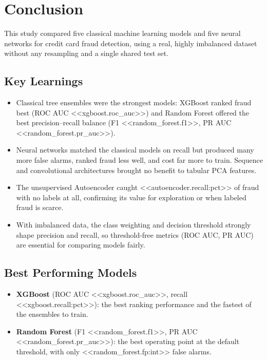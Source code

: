 \documentclass[journal]{IEEEtran}
\begin{document}
\section{Conclusion}
This study compared five classical machine learning models and five neural networks for credit card fraud detection, using a real, highly imbalanced dataset without any resampling and a single shared test set.

\subsection{Key Learnings}
\begin{itemize}
  \item Classical tree ensembles were the strongest models: XGBoost ranked fraud best (ROC AUC <<xgboost.roc_auc>>) and Random Forest offered the best precision--recall balance (F1 <<random_forest.f1>>, PR AUC <<random_forest.pr_auc>>).
  \item Neural networks matched the classical models on recall but produced many more false alarms, ranked fraud less well, and cost far more to train. Sequence and convolutional architectures brought no benefit to tabular PCA features.
  \item The unsupervised Autoencoder caught <<autoencoder.recall:pct>> of fraud with no labels at all, confirming its value for exploration or when labeled fraud is scarce.
  \item With imbalanced data, the class weighting and decision threshold strongly shape precision and recall, so threshold-free metrics (ROC AUC, PR AUC) are essential for comparing models fairly.
\end{itemize}

\subsection{Best Performing Models}
\begin{itemize}
  \item \textbf{XGBoost} (ROC AUC <<xgboost.roc_auc>>, recall <<xgboost.recall:pct>>): the best ranking performance and the fastest of the ensembles to train.
  \item \textbf{Random Forest} (F1 <<random_forest.f1>>, PR AUC <<random_forest.pr_auc>>): the best operating point at the default threshold, with only <<random_forest.fp:int>> false alarms.
\end{itemize}
\end{document}
